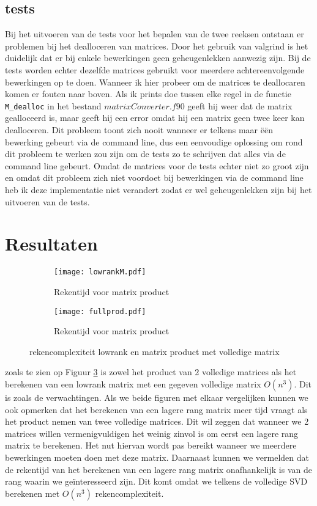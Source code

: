 \documentclass[a4paper]{article}
\begin{document}
\subsection*{tests}
Bij het uitvoeren van de tests voor het bepalen van de twee reeksen ontstaan er problemen bij het dealloceren van matrices. Door het gebruik van valgrind is het duidelijk dat er bij enkele bewerkingen geen geheugenlekken aanwezig zijn. Bij de tests worden echter dezelfde matrices gebruikt voor meerdere achtereenvolgende bewerkingen op te doen. Wanneer ik hier probeer om de matrices te deallocaren komen er fouten naar boven. Als ik prints doe tussen elke regel in de functie \verb! M_dealloc! in het bestand \(matrixConverter.f90\) geeft hij weer dat de matrix gealloceerd is, maar geeft hij een error omdat hij een matrix geen twee keer kan dealloceren. Dit probleem toont zich nooit wanneer er telkens maar \"e\"en bewerking gebeurt via de command line, dus een eenvoudige oplossing om rond dit probleem te werken zou zijn om de tests zo te schrijven dat alles via de command line gebeurt. Omdat de matrices voor de tests echter niet zo groot zijn en omdat dit probleem zich niet voordoet bij bewerkingen via de command line heb ik deze implementatie niet verandert zodat er wel geheugenlekken zijn bij het uitvoeren van de tests.


\section*{Resultaten}

\begin{figure}
\centering
\begin{subfigure}{.48\textwidth}
	\centering
	\texttt{[image: lowrankM.pdf]}
	\caption{Rekentijd voor matrix product}
	\label{lowrank}
\end{subfigure}
\begin{subfigure}{.48\textwidth}
	\centering
	\texttt{[image: fullprod.pdf]}
	\caption{Rekentijd voor matrix product}
	\label{fullprod}
\end{subfigure}
\caption{rekencomplexiteit lowrank en matrix product met volledige matrix}
\label{o3complex}
\end{figure}

zoals te zien op Figuur \ref{o3complex} is zowel het product van 2 volledige matrices als het berekenen van een lowrank matrix met een gegeven volledige matrix \(O(n^3)\). Dit is zoals de verwachtingen. Als we beide figuren met elkaar vergelijken kunnen we ook opmerken dat het berekenen van een lagere rang matrix meer tijd vraagt als het product nemen van twee volledige matrices. Dit wil zeggen dat wanneer we 2 matrices willen vermenigvuldigen het weinig zinvol is om eerst een lagere rang matrix te berekenen. Het nut hiervan wordt pas bereikt wanneer we meerdere bewerkingen moeten doen met deze matrix. Daarnaast kunnen we vermelden dat de rekentijd van het berekenen van een lagere rang matrix onafhankelijk is van de rang waarin we ge\"interesseerd zijn. Dit komt omdat we telkens de volledige SVD berekenen met \(O(n^3)\) rekencomplexiteit.
\end{document}
